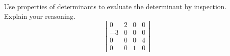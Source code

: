 \documentclass[12pt,letterpaper]{hmcpset}
\begin{document}
\begin{solution}
\vfill
\end{solution}
\newpage

\begin{problem}[4.2.33]
    Use properties of determinants to
    evaluate the determinant by inspection.
    Explain your reasoning.
    \[
        \left| \begin{matrix}
            0&2&0&0\\
            -3&0&0&0\\
            0&0&0&4\\
            0&0&1&0
        \end{matrix} \right|
    \]
\end{problem}

\begin{solution}
\vfill
\end{solution}
\end{document}
